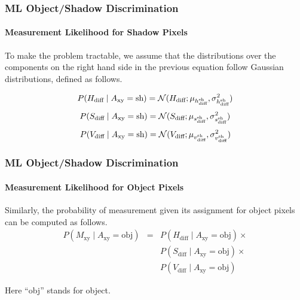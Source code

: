 
\ifnum{}

\begin{frame}
    \frametitle{ML Object/Shadow Discrimination}
    \framesubtitle{Measurement Likelihood for Shadow Pixels}

    To make the problem tractable, we assume that the distributions over 
    the components on the right hand side in the previous equation  
    follow Gaussian distributions, defined as follows.

    \begin{equation*}
        P(H_{\text{diff}} \mid A_{\text{xy}} = \text{sh}) =
        {\cal N}(H_{\text{diff}} ;
        \mu_{h_{\text{diff}}^{\text{sh}}},
        \sigma^2_{h_{\text{diff}}^{\text{sh}}})
    \end{equation*}
    \begin{equation*}
        P(S_{\text{diff}} \mid A_{\text{xy}} = \text{sh}) =
        {\cal N}(S_{\text{diff}} ;
        \mu_{s_{\text{diff}}^{\text{sh}}},
        \sigma^2_{s_{\text{diff}}^{\text{sh}}})
    \end{equation*}
    \begin{equation*}
        P(V_{\text{diff}} \mid A_{\text{xy}} = \text{sh}) =
        {\cal N}(V_{\text{diff}} ;
        \mu_{v_{\text{diff}}^{\text{sh}}},
        \sigma^2_{v_{\text{diff}}^{\text{sh}}})
    \end{equation*}

\end{frame}


\begin{frame}
    \frametitle{ML Object/Shadow Discrimination}
    \framesubtitle{Measurement Likelihood for Object Pixels}

    Similarly, the probability of measurement given its assignment 
    for object pixels can be computed as follows.
    \begin{equation*}
        \label{eq:foreground-measurement}
        \begin{array}{ccl}
            P(M_{\text{xy}} \mid A_{\text{xy}} = \text{obj}) 
                & = & P(H_{\text{diff}} \mid A_{\text{xy}} = \text{obj}) \times \\
                &   & P(S_{\text{diff}} \mid A_{\text{xy}} = \text{obj}) \times \\
                &   & P(V_{\text{diff}} \mid A_{\text{xy}} = \text{obj})
        \end{array}
    \end{equation*}
  
    Here ``obj'' stands for object. 

\end{frame}

